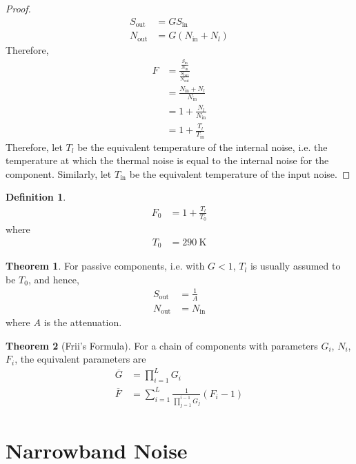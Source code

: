 \documentclass[titlepage, fleqn, a4paper, 12pt, twoside]{article}
\theoremstyle{definition}
\newtheorem{definition}{Definition}
\theoremstyle{theorem}
\newtheorem{theorem}{Theorem}
\begin{document}
\begin{proof}
	\begin{align*}
		S_{\text{out}} &= G S_{\text{in}}\\
		N_{\text{out}} &= G (N_{\text{in}} + N_l)
	\end{align*}
	Therefore,
	\begin{align*}
		F &= \frac{\frac{S_{\text{in}}}{N_{\text{in}}}}{\frac{S_{\text{out}}}{N_{\text{out}}}}\\
		&= \frac{N_{\text{in}} + N_l}{N_{\text{in}}}\\
		&= 1 + \frac{N_l}{N_{\text{in}}}\\
		&= 1 + \frac{T_l}{T_{\text{in}}}
	\end{align*}
	Therefore, let $T_l$ be the equivalent temperature of the internal noise, i.e. the temperature at which the thermal noise is equal to the internal noise for the component.
	Similarly, let $T_{\text{in}}$ be the equivalent temperature of the input noise.
\end{proof}

\begin{definition}
	\begin{align*}
		F_0 &= 1 + \frac{T_l}{T_0}
	\end{align*}
	where
	\begin{align*}
		T_0 &= \SI{290}{\kelvin}
	\end{align*}
\end{definition}

\begin{theorem}
	For passive components, i.e. with $G < 1$, $T_l$ is usually assumed to be $T_0$, and hence,
	\begin{align*}
		S_{\text{out}} &= \frac{1}{A}\\
		N_{\text{out}} &= N_{\text{in}}
	\end{align*}
	where $A$ is the attenuation.
\end{theorem}

\begin{theorem}[Frii's Formula]
	For a chain of components with parameters $G_i$, $N_i$, $F_i$, the equivalent parameters are
	\begin{align*}
		\overline{G} &= \prod\limits_{i = 1}^{L} G_i\\
		\overline{F} &= \sum\limits_{i = 1}^{L} \frac{1}{\prod\limits_{j = 1}^{i - 1} G_j} (F_i - 1)
	\end{align*}
\end{theorem}

\section{Narrowband Noise}
\end{document}
